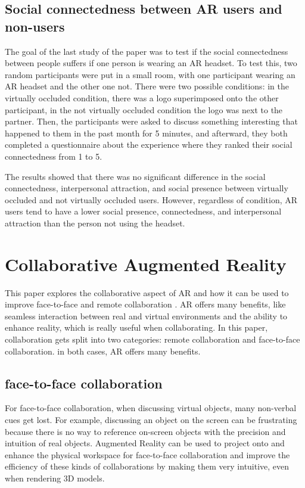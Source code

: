 \subsection{Social connectedness between AR users and non-users}

The goal of the last study of the paper was to test if the social connectedness between people suffers if one person is wearing an AR headset. To test this, two random participants were put in a small room, with one participant wearing an AR headset and the other one not. There were two possible conditions: in the virtually occluded condition, there was a logo superimposed onto the other participant, in the not virtually occluded condition the logo was next to the partner. Then, the participants were asked to discuss something interesting that happened to them in the past month for 5 minutes, and afterward, they both completed a questionnaire about the experience where they ranked their social connectedness from 1 to 5.

The results showed that there was no significant difference in the social connectedness, interpersonal attraction, and social presence between virtually occluded and not virtually occluded users. However, regardless of condition, AR users tend to have a lower social presence, connectedness, and interpersonal attraction than the person not using the headset.

\section{Collaborative Augmented Reality}

This paper explores the collaborative aspect of AR and how it can be used to improve face-to-face and remote collaboration \cite{CollaborativeAR}. AR offers many benefits, like seamless interaction between real and virtual environments and the ability to enhance reality, which is really useful when collaborating. In this paper, collaboration gets split into two categories: remote collaboration and face-to-face collaboration. in both cases, AR offers many benefits.

\subsection{face-to-face collaboration}
For face-to-face collaboration, when discussing virtual objects, many non-verbal cues get lost. For example, discussing an object on the screen can be frustrating because there is no way to reference on-screen objects with the precision and intuition of real objects. Augmented Reality can be used to project onto and enhance the physical workspace for face-to-face collaboration and improve the efficiency of these kinds of collaborations by making them very intuitive, even when rendering 3D models.

